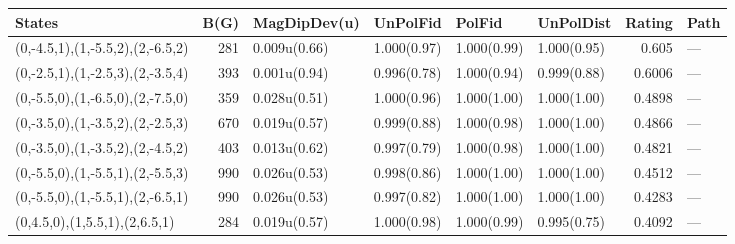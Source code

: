 \begin{tabular}{lrllllrl}
\hline
 States                           &   B(G) & MagDipDev(u)   & UnPolFid    & PolFid      & UnPolDist   &   Rating & Path   \\
\hline
 (0,-4.5,1),(1,-5.5,2),(2,-6.5,2) &    281 & 0.009u(0.66)   & 1.000(0.97) & 1.000(0.99) & 1.000(0.95) &   0.605  & ---    \\
 (0,-2.5,1),(1,-2.5,3),(2,-3.5,4) &    393 & 0.001u(0.94)   & 0.996(0.78) & 1.000(0.94) & 0.999(0.88) &   0.6006 & ---    \\
 (0,-5.5,0),(1,-6.5,0),(2,-7.5,0) &    359 & 0.028u(0.51)   & 1.000(0.96) & 1.000(1.00) & 1.000(1.00) &   0.4898 & ---    \\
 (0,-3.5,0),(1,-3.5,2),(2,-2.5,3) &    670 & 0.019u(0.57)   & 0.999(0.88) & 1.000(0.98) & 1.000(1.00) &   0.4866 & ---    \\
 (0,-3.5,0),(1,-3.5,2),(2,-4.5,2) &    403 & 0.013u(0.62)   & 0.997(0.79) & 1.000(0.98) & 1.000(1.00) &   0.4821 & ---    \\
 (0,-5.5,0),(1,-5.5,1),(2,-5.5,3) &    990 & 0.026u(0.53)   & 0.998(0.86) & 1.000(1.00) & 1.000(1.00) &   0.4512 & ---    \\
 (0,-5.5,0),(1,-5.5,1),(2,-6.5,1) &    990 & 0.026u(0.53)   & 0.997(0.82) & 1.000(1.00) & 1.000(1.00) &   0.4283 & ---    \\
 (0,4.5,0),(1,5.5,1),(2,6.5,1)    &    284 & 0.019u(0.57)   & 1.000(0.98) & 1.000(0.99) & 0.995(0.75) &   0.4092 & ---    \\
\hline
\end{tabular}